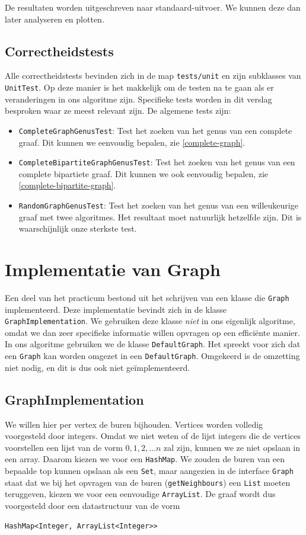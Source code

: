 \documentclass{article}
\begin{document}
De resultaten worden uitgeschreven naar standaard-uitvoer. We kunnen deze dan
later analyseren en plotten.

\subsection{Correctheidstests}
\label{correctheidstests}
Alle correctheidstests bevinden zich in de map \verb#tests/unit# en zijn
subklasses van \verb#UnitTest#. Op deze manier is het makkelijk om de testen na
te gaan als er veranderingen in ons algoritme zijn. Specifieke tests worden
in dit verslag besproken waar ze meest relevant zijn. De algemene tests zijn:
\begin{itemize}
\item \verb#CompleteGraphGenusTest#: Test het zoeken van het genus van een
complete graaf. Dit kunnen we eenvoudig bepalen, zie \ref{complete-graph}.
\item \verb#CompleteBipartiteGraphGenusTest#: Test het zoeken van het genus van
een complete bipartiete graaf. Dit kunnen we ook eenvoudig bepalen, zie 
\ref{complete-bipartite-graph}.
\item \verb#RandomGraphGenusTest#: Test het zoeken van het genus van een
willeukeurige graaf met twee algoritmes. Het resultaat moet natuurlijk
hetzelfde zijn. Dit is waarschijnlijk onze sterkste test.
\end{itemize}

\section{Implementatie van Graph}
Een deel van het practicum bestond uit het schrijven van een klasse die
\verb#Graph# implementeerd. Deze implementatie bevindt zich in de klasse
\verb#GraphImplementation#. We gebruiken deze klasse \emph{niet} in ons
eigenlijk algoritme, omdat we dan zeer specifieke informatie willen opvragen
op een effici\"ente manier. In ons algoritme gebruiken we de klasse
\verb#DefaultGraph#. Het spreekt voor zich dat een \verb#Graph# kan worden
omgezet in een \verb#DefaultGraph#. Omgekeerd is de omzetting niet nodig, en dit
is dus ook niet ge\"implementeerd.

\subsection{GraphImplementation}
We willen hier per vertex de buren bijhouden. Vertices worden volledig
voorgesteld door integers. Omdat we niet weten of de lijst integers die de
vertices voorstellen een lijst van de vorm $0, 1, 2, \dots n$ zal zijn,
kunnen we ze niet opslaan in een array. Daarom kiezen we voor een
\verb#HashMap#. We zouden de buren van een bepaalde top kunnen opslaan als een
\verb#Set#, maar aangezien in de interface \verb#Graph# staat dat we bij het
opvragen van de buren (\verb#getNeighbours#) een \verb#List# moeten teruggeven,
kiezen we voor een eenvoudige \verb#ArrayList#. De graaf wordt dus voorgesteld
door een datastructuur van de vorm
\begin{verbatim}
HashMap<Integer, ArrayList<Integer>>
\end{verbatim}
\end{document}
